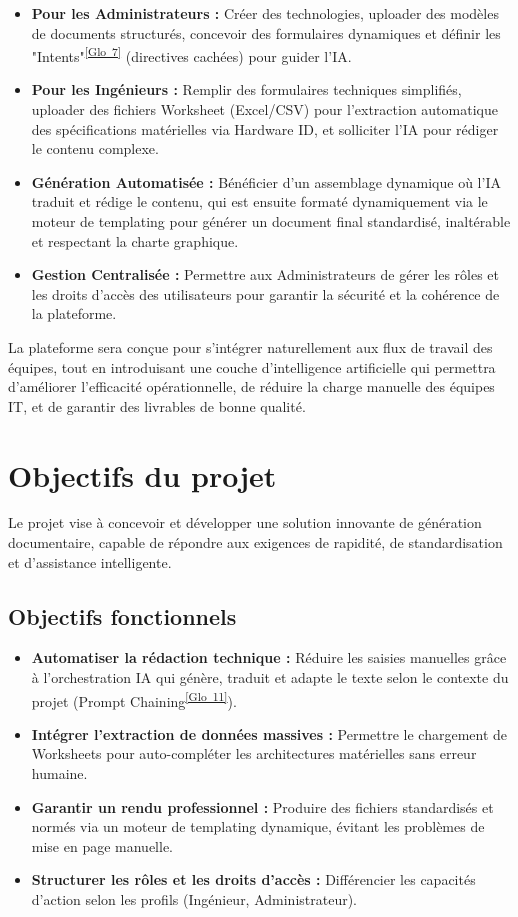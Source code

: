\documentclass[12pt, a4paper]{report}
\newcommand{\gloref}[1]{\textsuperscript{\hyperlink{glo:#1}{[Glo~#1]}}}
\begin{document}
\begin{itemize}
    \item \textbf{Pour les Administrateurs :} Créer des technologies, uploader des modèles de documents structurés, concevoir des formulaires dynamiques et définir les "Intents"\gloref{7} (directives cachées) pour guider l'IA.
    \item \textbf{Pour les Ingénieurs :} Remplir des formulaires techniques simplifiés, uploader des fichiers Worksheet (Excel/CSV) pour l'extraction automatique des spécifications matérielles via Hardware ID, et solliciter l'IA pour rédiger le contenu complexe.
    \item \textbf{Génération Automatisée :} Bénéficier d'un assemblage dynamique où l'IA traduit et rédige le contenu, qui est ensuite formaté dynamiquement via le moteur de templating pour générer un document final standardisé, inaltérable et respectant la charte graphique.
    \item \textbf{Gestion Centralisée :} Permettre aux Administrateurs de gérer les rôles et les droits d’accès des utilisateurs pour garantir la sécurité et la cohérence de la plateforme.
\end{itemize}

La plateforme sera conçue pour s’intégrer naturellement aux flux de travail des équipes, tout en introduisant une couche d’intelligence artificielle qui permettra d’améliorer l'efficacité opérationnelle, de réduire la charge manuelle des équipes IT, et de garantir des livrables de bonne qualité.

\section{Objectifs du projet}
Le projet vise à concevoir et développer une solution innovante de génération documentaire, capable de répondre aux exigences de rapidité, de standardisation et d’assistance intelligente. 

\subsection{Objectifs fonctionnels}
\begin{itemize}
    \item \textbf{Automatiser la rédaction technique :} Réduire les saisies manuelles grâce à l'orchestration IA qui génère, traduit et adapte le texte selon le contexte du projet (Prompt Chaining\gloref{11}).
    \item \textbf{Intégrer l'extraction de données massives :} Permettre le chargement de Worksheets pour auto-compléter les architectures matérielles sans erreur humaine.
    \item \textbf{Garantir un rendu professionnel :} Produire des fichiers standardisés et normés via un moteur de templating dynamique, évitant les problèmes de mise en page manuelle.
    \item \textbf{Structurer les rôles et les droits d’accès :} Différencier les capacités d’action selon les profils (Ingénieur, Administrateur).
\end{itemize}
\end{document}
